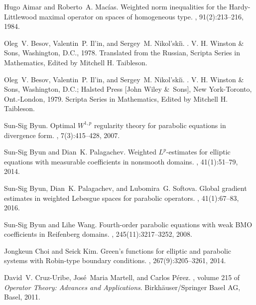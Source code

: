 \documentclass[reqno]{amsart}
\numberwithin{equation}{section}
\theoremstyle{plain}
\theoremstyle{definition}
\theoremstyle{remark}
\begin{document}


\begin{thebibliography}{10}

Hugo Aimar and Roberto~A. Mac\'ias.
\newblock Weighted norm inequalities for the {H}ardy-{L}ittlewood maximal
  operator on spaces of homogeneous type.
, 91(2):213--216, 1984.

Oleg~V. Besov, Valentin~P. Il'in, and Sergey~M. Nikol'ski{\u\i}.
.
\newblock V. H. Winston \& Sons, Washington, D.C., 1978.
\newblock Translated from the Russian, Scripta Series in Mathematics, Edited by
  Mitchell H. Taibleson.

Oleg~V. Besov, Valentin~P. Il'in, and Sergey~M. Nikol'ski{\u\i}.
.
\newblock V. H. Winston \& Sons, Washington, D.C.; Halsted Press [John Wiley
  \&\ Sons], New York-Toronto, Ont.-London, 1979.
\newblock Scripta Series in Mathematics, Edited by Mitchell H. Taibleson.

Sun-Sig Byun.
\newblock Optimal ${W}^{1,p}$ regularity theory for parabolic equations in
  divergence form.
, 7(3):415--428, 2007.

Sun-Sig Byun and Dian~K. Palagachev.
\newblock Weighted {$L^p$}-estimates for elliptic equations with measurable
  coefficients in nonsmooth domains.
, 41(1):51--79, 2014.

Sun-Sig Byun, Dian~K. Palagachev, and Lubomira~G. Softova.
\newblock Global gradient estimates in weighted {L}ebesgue spaces for parabolic
  operators.
, 41(1):67--83, 2016.

Sun-Sig Byun and Lihe Wang.
\newblock Fourth-order parabolic equations with weak {BMO} coefficients in
  {R}eifenberg domains.
, 245(11):3217--3252, 2008.

Jongkeun Choi and Seick Kim.
\newblock Green's functions for elliptic and parabolic systems with
  {R}obin-type boundary conditions.
, 267(9):3205--3261, 2014.

David~V. Cruz-Uribe, Jos\'e~Maria Martell, and Carlos P\'erez.
,
  volume 215 of {\em Operator Theory: Advances and Applications}.
\newblock Birkh\"auser/Springer Basel AG, Basel, 2011.


\end{thebibliography}
\end{document}
